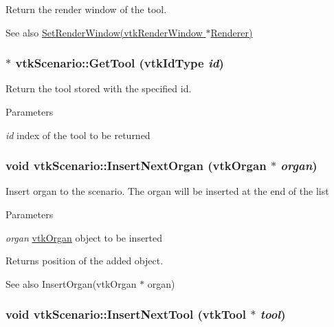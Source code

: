 Return the render window of the tool. \begin{DoxySeeAlso}{See also}
\hyperlink{classvtkScenario_a65e86f64884268d0e100345d472a35c8}{SetRenderWindow(vtkRenderWindow $\ast$Renderer)} 
\end{DoxySeeAlso}
\hypertarget{classvtkScenario_a16431d22983601557b1ea7fb3e62bc21}{
\subsubsection[{GetTool}]{ $\ast$ vtkScenario::GetTool (vtkIdType {\em id})}}
\label{classvtkScenario_a16431d22983601557b1ea7fb3e62bc21}


Return the tool stored with the specified id. 
\begin{DoxyParams}{Parameters}
\item[{\em id}]index of the tool to be returned \end{DoxyParams}
\hypertarget{classvtkScenario_ab7aa43b4f165675fdfc437e142a466f3}{
\subsubsection[{InsertNextOrgan}]{\setlength{\rightskip}{0pt plus 5cm}void vtkScenario::InsertNextOrgan ({\bf vtkOrgan} $\ast$ {\em organ})}}
\label{classvtkScenario_ab7aa43b4f165675fdfc437e142a466f3}


Insert organ to the scenario. The organ will be inserted at the end of the list 
\begin{DoxyParams}{Parameters}
\item[{\em organ}]\hyperlink{classvtkOrgan}{vtkOrgan} object to be inserted \end{DoxyParams}
\begin{DoxyReturn}{Returns}
position of the added object. 
\end{DoxyReturn}
\begin{DoxySeeAlso}{See also}
InsertOrgan(vtkOrgan $\ast$ organ) 
\end{DoxySeeAlso}
\hypertarget{classvtkScenario_a5fd09f275e65e233038c0a6662bc2604}{
\subsubsection[{InsertNextTool}]{\setlength{\rightskip}{0pt plus 5cm}void vtkScenario::InsertNextTool ({\bf vtkTool} $\ast$ {\em tool})}}
\label{classvtkScenario_a5fd09f275e65e233038c0a6662bc2604}


